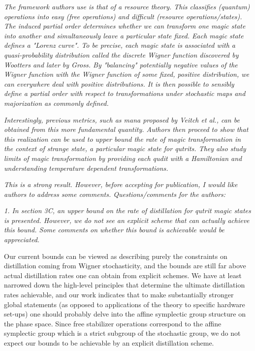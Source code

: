 \documentclass[11pt]{letter}
\begin{document}
\textit{The framework authors use is that of a resource theory. This classifies (quantum) operations into easy (free operations) and difficult (resource operations/states). The induced partial order determines whether we can transform one magic state into another and simultaneously leave a particular state fixed. Each magic state defines a "Lorenz curve". To be precise, each magic state is associated with a quasi-probability distribution called the discrete Wigner function discovered by Wootters and later by Gross. By "balancing" potentially negative values of the Wigner function with the Wigner function of some fixed, positive distribution, we can everywhere deal with positive distributions. It is then possible to sensibly define a partial order with respect to transformations under stochastic maps and majorization as commonly defined.}

\textit{Interestingly, previous metrics, such as mana proposed by Veitch et al., can be obtained from this more fundamental quantity. Authors then proceed to show that this realization can be used to upper bound the rate of magic transformation in the context of strange state, a particular magic state for qutrits. They also study limits of magic transformation by providing each qudit with a Hamiltonian and understanding temperature dependent transformations.}

\textit{This is a strong result. However, before accepting for publication, I would like authors to address some comments.
Questions/comments for the authors:}


\textit{1. In section 3C, an upper bound on the rate of distillation for qutrit magic states is presented. However, we do not see an explicit scheme that can actually achieve this bound. Some comments on whether this bound is achievable would be appreciated.}

Our current bounds can be viewed as describing purely the constraints on distillation coming from Wigner stochasticity, and the bounds are still far above actual distillation rates one can obtain from explicit schemes. We have at least narrowed down the high-level principles that determine the ultimate distillation rates achievable, and our work indicates that to make substantially stronger global statements (as opposed to applications of the theory to specific hardware set-ups) one should probably delve into the affine symplectic group structure on the phase space.
Since free stabilizer operations correspond to the affine symplectic group which is a strict subgroup of the stochastic group, we do not expect our bounds to be achievable by an explicit distillation scheme.
\end{document}
